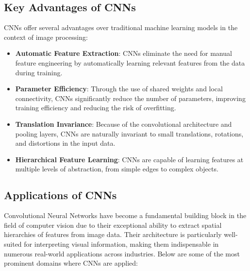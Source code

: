 \subsection{Key Advantages of CNNs}
CNNs offer several advantages over traditional machine learning models in the context of image processing:
\begin{itemize}
    \item \textbf{Automatic Feature Extraction}: CNNs eliminate the need for manual feature engineering by automatically learning relevant features from the data during training.
    \item \textbf{Parameter Efficiency}: Through the use of shared weights and local connectivity, CNNs significantly reduce the number of parameters, improving training efficiency and reducing the risk of overfitting.
    \item \textbf{Translation Invariance}: Because of the convolutional architecture and pooling layers, CNNs are naturally invariant to small translations, rotations, and distortions in the input data.
    \item \textbf{Hierarchical Feature Learning}: CNNs are capable of learning features at multiple levels of abstraction, from simple edges to complex objects.



\end{itemize}
\subsection{Applications of CNNs}
Convolutional Neural Networks have become a fundamental building block in the field of computer vision due to their exceptional ability to extract spatial hierarchies of features from image data. Their architecture is particularly well-suited for interpreting visual information, making them indispensable in numerous real-world applications across industries. Below are some of the most prominent domains where CNNs are applied:

